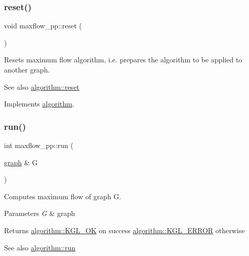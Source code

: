 \subsubsection{\texorpdfstring{reset()}{reset()}}
{\footnotesize\ttfamily void maxflow\+\_\+pp\+::reset (\begin{DoxyParamCaption}{ }\end{DoxyParamCaption})\hspace{0.3cm}{\ttfamily [virtual]}}

Resets maximum flow algorithm, i.\+e. prepares the algorithm to be applied to another graph. \begin{DoxySeeAlso}{See also}
\mbox{\hyperlink{classalgorithm_a21aba63d066ae7897de6ca7d8425c408}{algorithm\+::reset}} 
\end{DoxySeeAlso}


Implements \mbox{\hyperlink{classalgorithm_a21aba63d066ae7897de6ca7d8425c408}{algorithm}}.

\mbox{\label{classmaxflow__pp_a07c7cb1ae5db23d87cf49ce7769b2814}} 
\subsubsection{\texorpdfstring{run()}{run()}}
{\footnotesize\ttfamily int maxflow\+\_\+pp\+::run (\begin{DoxyParamCaption}\item[{\mbox{\hyperlink{classgraph}{graph}} \&}]{G }\end{DoxyParamCaption})\hspace{0.3cm}{\ttfamily [virtual]}}

Computes maximum flow of graph {\ttfamily G}.


\begin{DoxyParams}{Parameters}
{\em G} & graph \\
\hline
\end{DoxyParams}
\begin{DoxyReturn}{Returns}
{\ttfamily \mbox{\hyperlink{classalgorithm_af1a0078e153aa99c24f9bdf0d97f6710aae4c1cd7fe8d8cf4b143241a6e7c31cf}{algorithm\+::\+K\+G\+L\+\_\+\+OK}}} on success {\ttfamily \mbox{\hyperlink{classalgorithm_af1a0078e153aa99c24f9bdf0d97f6710ae67bf27b2ef31f73e545a7f9f4a69556}{algorithm\+::\+K\+G\+L\+\_\+\+E\+R\+R\+OR}}} otherwise 
\end{DoxyReturn}
\begin{DoxySeeAlso}{See also}
\mbox{\hyperlink{classalgorithm_a734b189509a8d6b56b65f8ff772d43ca}{algorithm\+::run}} 
\end{DoxySeeAlso}


